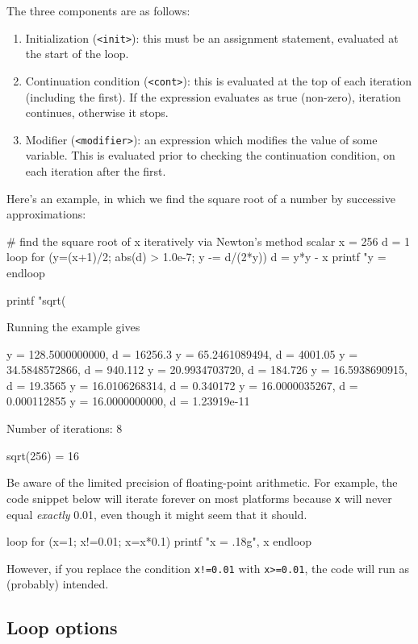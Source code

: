 The three components are as follows:
\begin{enumerate}
\item Initialization (\texttt{<init>}): this must be an assignment
  statement, evaluated at the start of the loop.
\item Continuation condition (\texttt{<cont>}): this is evaluated at
  the top of each iteration (including the first).  If the expression
  evaluates as true (non-zero), iteration continues, otherwise it
  stops. 
\item Modifier (\texttt{<modifier>}): an expression which modifies the
  value of some variable.  This is evaluated prior to checking the
  continuation condition, on each iteration after the first.
\end{enumerate}

Here's an example, in which we find the square root of a number by
successive approximations:
\begin{code}
# find the square root of x iteratively via Newton's method
scalar x = 256
d = 1
loop for (y=(x+1)/2; abs(d) > 1.0e-7; y -= d/(2*y))
    d = y*y - x
    printf "y = %
endloop

printf "sqrt(%
\end{code}
Running the example gives
\begin{code}
y =  128.5000000000, d = 16256.3
y =   65.2461089494, d = 4001.05
y =   34.5848572866, d = 940.112
y =   20.9934703720, d = 184.726
y =   16.5938690915, d = 19.3565
y =   16.0106268314, d = 0.340172
y =   16.0000035267, d = 0.000112855
y =   16.0000000000, d = 1.23919e-11

Number of iterations: 8

sqrt(256) = 16
\end{code}
Be aware of the limited precision of floating-point arithmetic. For
example, the code snippet below will iterate forever on most platforms
because \texttt{x} will never equal \textit{exactly} 0.01, even though
it might seem that it should.
\begin{code}
loop for (x=1; x!=0.01; x=x*0.1)
    printf "x = .18g\n", x
endloop  
\end{code}
However, if you replace the condition \texttt{x!=0.01} with
\texttt{x>=0.01}, the code will run as (probably) intended.
 
\subsection{Loop options}

